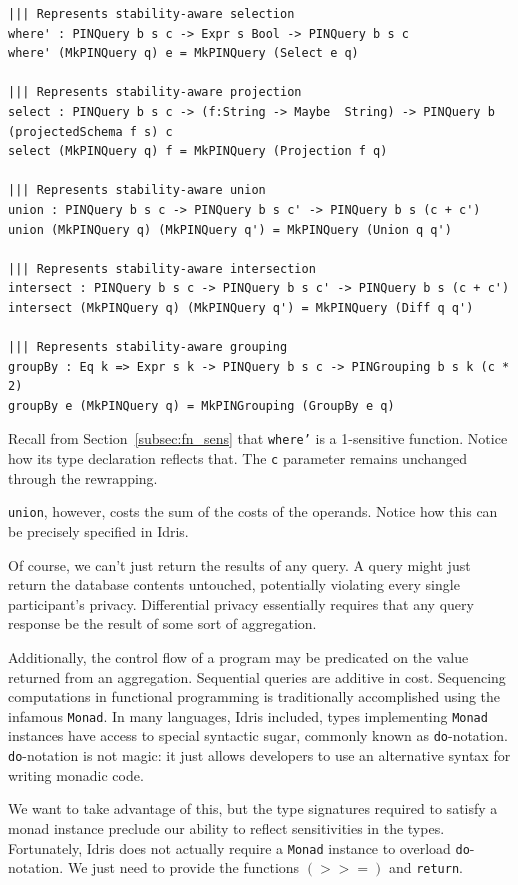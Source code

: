 \documentclass[12pt]{report}
\begin{document}
\begin{lstlisting}[caption={Representing privacy-aware transformations},label={lst:transformations}]
||| Represents stability-aware selection
where' : PINQuery b s c -> Expr s Bool -> PINQuery b s c
where' (MkPINQuery q) e = MkPINQuery (Select e q)

||| Represents stability-aware projection
select : PINQuery b s c -> (f:String -> Maybe  String) -> PINQuery b (projectedSchema f s) c
select (MkPINQuery q) f = MkPINQuery (Projection f q)

||| Represents stability-aware union
union : PINQuery b s c -> PINQuery b s c' -> PINQuery b s (c + c')
union (MkPINQuery q) (MkPINQuery q') = MkPINQuery (Union q q')

||| Represents stability-aware intersection
intersect : PINQuery b s c -> PINQuery b s c' -> PINQuery b s (c + c')
intersect (MkPINQuery q) (MkPINQuery q') = MkPINQuery (Diff q q')

||| Represents stability-aware grouping
groupBy : Eq k => Expr s k -> PINQuery b s c -> PINGrouping b s k (c * 2)
groupBy e (MkPINQuery q) = MkPINGrouping (GroupBy e q)
\end{lstlisting}

Recall from Section~\ref{subsec:fn_sens} that \texttt{where'} is a 1-sensitive function.
Notice how its type declaration reflects that.
The \texttt{c} parameter remains unchanged through the rewrapping.

\texttt{union}, however, costs the sum of the costs of the operands.
Notice how this can be precisely specified in Idris.

Of course, we can't just return the results of any query.
A query might just return the database contents untouched, potentially violating every single participant's privacy.
Differential privacy essentially requires that any query response be the result of some sort of aggregation.

Additionally, the control flow of a program may be predicated on the value returned from an aggregation.
Sequential queries are additive in cost.
Sequencing computations in functional programming is traditionally accomplished using the infamous \texttt{Monad}.
In many languages, Idris included, types implementing \texttt{Monad} instances have access to special syntactic sugar, commonly known as \texttt{do}-notation.
\texttt{do}-notation is not magic: it just allows developers to use an alternative syntax for writing monadic code.

We want to take advantage of this, but the type signatures required to satisfy a monad instance preclude our ability to reflect sensitivities in the types.
Fortunately, Idris does not actually require a \texttt{Monad} instance to overload \texttt{do}-notation.
We just need to provide the functions \texttt{$(>>=)$} and \texttt{return}.
\end{document}
